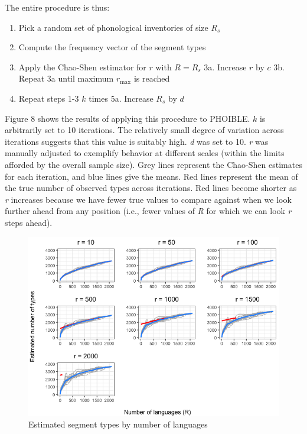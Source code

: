 \documentclass[
]{article}
\providecommand{\tightlist}{%
  \setlength{\itemsep}{0pt}\setlength{\parskip}{0pt}}
\begin{document}
The entire procedure is thus:

\begin{enumerate}
\def\labelenumi{\arabic{enumi}.}
\tightlist
\item
  Pick a random set of phonological inventories of size \(R_s\)
\item
  Compute the frequency vector of the segment types
\item
  Apply the Chao-Shen estimator for \(r\) with \(R = R_s\) 3a. Increase
  \(r\) by \(c\) 3b. Repeat 3a until maximum \(r_{\text{max}}\) is
  reached
\item
  Repeat steps 1-3 \(k\) times 5a. Increase \(R_s\) by \(d\)
\end{enumerate}

Figure 8 shows the results of applying this procedure to PHOIBLE. \(k\)
is arbitrarily set to 10 iterations. The relatively small degree of
variation across iterations suggests that this value is suitably high.
\emph{d} was set to 10. \emph{r} was manually adjusted to exemplify
behavior at different scales (within the limits afforded by the overall
sample size). Grey lines represent the Chao-Shen estimates for each
iteration, and blue lines give the means. Red lines represent the mean
of the true number of observed types across iterations. Red lines become
shorter as \emph{r} increases because we have fewer true values to
compare against when we look further ahead from any position (i.e.,
fewer values of \emph{R} for which we can look \emph{r} steps ahead).

\begin{figure}

{\centering \includegraphics[width=0.8\linewidth]{README_files/figure-gfm/chao_lang_types-1} 

}

\caption{\label{fig:chao_lang_types}Estimated segment types by number of languages}\label{fig:chao_lang_types}
\end{figure}
\end{document}
